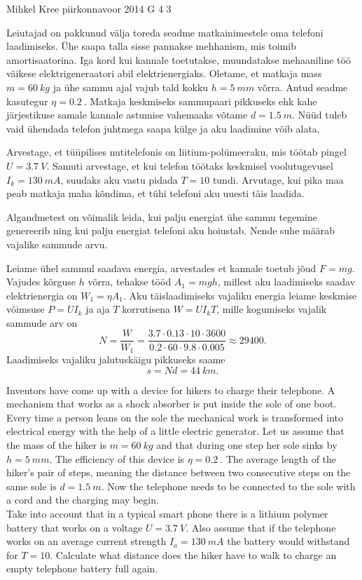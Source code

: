 {Mihkel Kree} %
{piirkonnavoor} %
{2014} %
{G 4} %
{3} %
{
\ifStatement
Leiutajad on pakkunud välja toreda seadme matkainimestele oma telefoni laadimiseks. Ühe saapa talla sisse pannakse mehhanism, mis toimib amortisaatorina. Iga kord kui kannale toetutakse, muundatakse mehaaniline töö väikese elektrigeneraatori abil elektrienergiaks. Oletame, et matkaja mass $m=\SI{60}{kg}$ ja ühe sammu ajal vajub tald kokku 
$h=\SI{5}{mm}$ võrra. Antud seadme kasutegur $\eta = \SI{0,2}{}$. Matkaja keskmiseks sammupaari pikkuseks ehk kahe järjestikuse samale kannale astumise vahemaaks võtame $d=\SI{1.5}{m}$. Nüüd tuleb vaid ühendada telefon juhtmega saapa külge ja aku laadimine võib alata.

Arvestage, et tüüpilises nutitelefonis on liitium-polümeeraku, mis töötab pingel $U=\SI{3.7}{V}$. Samuti arvestage, et kui telefon töötaks keskmisel voolutugevusel $I_k=\SI{130}{mA}$, suudaks aku vastu pidada $T=10$ tundi. Arvutage, kui pika maa peab matkaja maha kõndima, et tühi telefoni aku uuesti täis laadida.
\fi


\ifHint
Algandmetest on võimalik leida, kui palju energiat ühe sammu tegemine genereerib ning kui palju energiat telefoni aku hoiustab. Nende suhe määrab vajalike sammude arvu.
\fi


\ifSolution
Leiame ühel sammul saadava energia, arvestades et kannale toetub jõud $F=mg$. Vajudes kõrguse $h$ võrra, tehakse tööd $A_1 = mgh$, millest aku laadimiseks saadav elektrienergia on $W_1=\eta A_1$. 
Aku täislaadimiseks vajaliku energia leiame keskmise võimsuse $P=UI_k$ ja aja $T$ korrutisena $W=UI_kT$, mille kogumiseks vajalik sammude arv on
\[N = \frac{W}{W_1} = \frac{3.7 \cdot 0.13 \cdot 10 \cdot 3600 }{0.2 \cdot 60\cdot 9.8 \cdot 0.005}\approx29400.\]
Laadimiseks vajaliku jalutuskäigu pikkuseks saame
\[s=Nd = \SI{44}{km}.\]
\fi


\ifEngStatement
Inventors have come up with a device for hikers to charge their telephone. A mechanism that works as a shock absorber is put inside the sole of one boot. Every time a person leans on the sole the mechanical work is transformed into electrical energy with the help of a little electric generator. Let us assume that the mass of the hiker is $m=\SI{60}{kg}$ and that during one step her sole sinks by $h=\SI{5}{mm}$. The efficiency of this device is $\eta = \SI{0,2}{}$. The average length of the hiker’s pair of steps, meaning the distance between two consecutive steps on the same sole is $d=\SI{1.5}{m}$. Now the telephone needs to be connected to the sole with a cord and the charging may begin.\\
Take into account that in a typical smart phone there is a lithium polymer battery that works on a voltage $U=\SI{3.7}{V}$. Also assume that if the telephone works on an average current strength $I_a=\SI{130}{mA}$ the battery would withstand for $T=10$. Calculate what distance does the hiker have to walk to charge an empty telephone battery full again.
\fi


}
